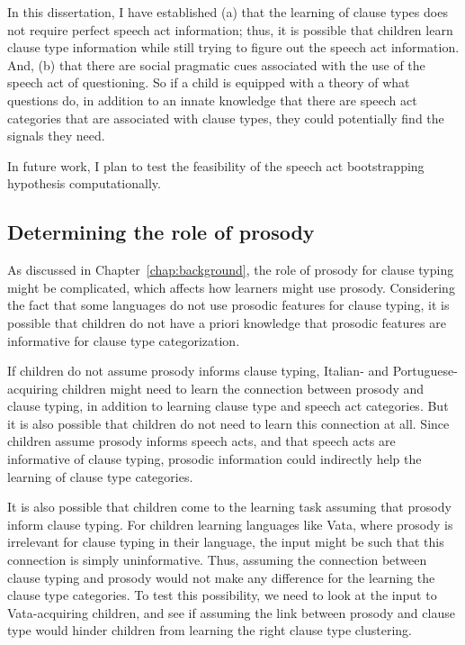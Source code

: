 In this dissertation, I have established (a) that the learning of clause types does not require perfect speech act information; thus, it is possible that children learn clause type information while still trying to figure out the speech act information. And, (b) that there are social pragmatic cues associated with the use of the speech act of questioning. So if a child is equipped with a theory of what questions do, in addition to an innate knowledge that there are speech act categories that are associated with clause types, they could potentially find the signals they need.

In future work, I plan to test the feasibility of the speech act bootstrapping hypothesis computationally.



\subsection{Determining the role of prosody}

As discussed in Chapter~\ref{chap:background}, the role of prosody for clause typing might be complicated, which affects how learners might use prosody. Considering the fact that some languages do not use prosodic features for clause typing, it is possible that children do not have a priori knowledge that prosodic features are informative for clause type categorization.  

If children do not assume prosody informs clause typing, Italian- and Portuguese-acquiring children might need to learn the connection between prosody and clause typing, in addition to learning clause type and speech act categories. But it is also possible that children do not need to learn this connection at all. Since children assume prosody informs speech acts, and that speech acts are informative of clause typing, prosodic information could indirectly help the learning of clause type categories. 

It is also possible that children come to the learning task assuming that prosody  inform clause typing. For children learning languages like Vata, where prosody is irrelevant for clause typing in their language, the input might be such that this connection is simply uninformative. Thus, assuming the connection between clause typing and prosody would not make any difference for the learning the clause type categories. To test this possibility, we need to look at the input to Vata-acquiring children, and see if assuming the link between prosody and clause type would hinder children from learning the right clause type clustering. 

